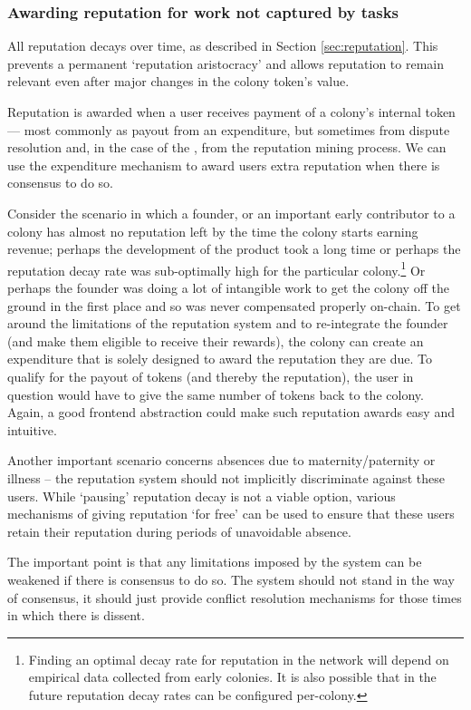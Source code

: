 \subsubsection{Awarding reputation for work not captured by tasks}

All reputation decays over time, as described in Section \ref{sec:reputation}. This prevents a permanent `reputation aristocracy' and allows reputation to remain relevant even after major changes in the colony token's value.

Reputation is awarded when a user receives payment of a colony's internal token --- most commonly as payout from an expenditure, but sometimes from dispute resolution and, in the case of the \rc, from the reputation mining process. We can use the expenditure mechanism to award users extra reputation when there is consensus to do so.

Consider the scenario in which a founder, or an important early contributor to a colony has almost no reputation left by the time the colony starts earning revenue; perhaps the development of the product took a long time or perhaps the reputation decay rate was sub-optimally high for the particular colony.\footnote{Finding an optimal decay rate for reputation in the network will depend on empirical data collected from early colonies. It is also possible that in the future reputation decay rates can be configured per-colony.} Or perhaps the founder was doing a lot of intangible work to get the colony off the ground in the first place and so was never compensated properly on-chain. To get around the limitations of the reputation system and to re-integrate the founder (and make them eligible to receive their rewards), the colony can create an expenditure that is solely designed to award the reputation they are due. To qualify for the payout of tokens (and thereby the reputation), the user in question would have to give the same number of tokens back to the colony. Again, a good frontend abstraction could make such reputation awards easy and intuitive.

Another important scenario concerns absences due to maternity/paternity or illness -- the reputation system should not implicitly discriminate against these users. While `pausing' reputation decay is not a viable option, various mechanisms of giving reputation `for free' can be used to ensure that these users retain their reputation during periods of unavoidable absence.

The important point is that any limitations imposed by the system can be weakened if there is consensus to do so. The system should not stand in the way of consensus, it should just provide conflict resolution mechanisms for those times in which there is dissent.

